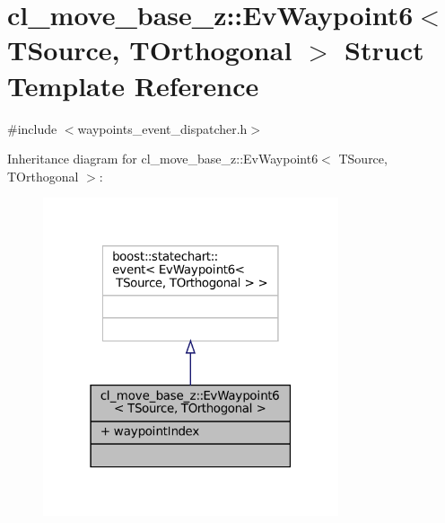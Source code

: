 \hypertarget{structcl__move__base__z_1_1EvWaypoint6}{}\section{cl\+\_\+move\+\_\+base\+\_\+z\+:\+:Ev\+Waypoint6$<$ T\+Source, T\+Orthogonal $>$ Struct Template Reference}
\label{structcl__move__base__z_1_1EvWaypoint6}


{\ttfamily \#include $<$waypoints\+\_\+event\+\_\+dispatcher.\+h$>$}



Inheritance diagram for cl\+\_\+move\+\_\+base\+\_\+z\+:\+:Ev\+Waypoint6$<$ T\+Source, T\+Orthogonal $>$\+:
\nopagebreak
\begin{figure}[H]
\begin{center}
\leavevmode
\includegraphics[width=247pt]{structcl__move__base__z_1_1EvWaypoint6__inherit__graph}
\end{center}
\end{figure}


